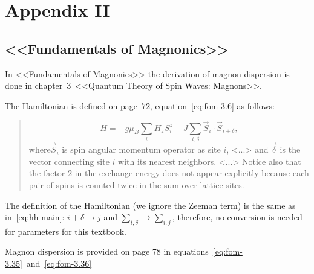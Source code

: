 \section{Appendix II}

\subsection{<<Fundamentals of Magnonics>>\cite{rezende2020fundamentals}}

    In <<Fundamentals of Magnonics>> the derivation of magnon dispersion is done in chapter~$3$~<<Quantum Theory of Spin Waves: Magnons>>.

    The Hamiltonian is defined on page~$72$, equation~\eqref{eq:fom-3.6} as follows:

    \begin{quote}
        \begin{equation}
            H = -g\mu_B\sum_iH_zS_i^z - J\sum_{i, \delta}\vec{S}_i \cdot \vec{S}_{i+\delta}, \label{eq:fom-3.6} \tag{3.6}
        \end{equation}
        where$\vec{S}_i$ is spin angular momentum operator as site $i$, <...> and $\vec{\delta}$ is the vector connecting site $i$ with its nearest neighbors. 
        <...> Notice also that the factor 2 in the exchange energy does not appear explicitly because each pair of spins is counted twice in the sum over lattice sites.
    \end{quote}

    The definition of the Hamiltonian (we ignore the Zeeman term) is the same as in~\eqref{eq:hh-main}: $i + \delta \rightarrow j$ and $\sum_{i, \delta} \rightarrow \sum_{i,j}$, therefore, no conversion is needed for parameters for this textbook.

    Magnon dispersion is provided on page $78$ in equations~\eqref{eq:fom-3.35}~and~\eqref{eq:fom-3.36}

